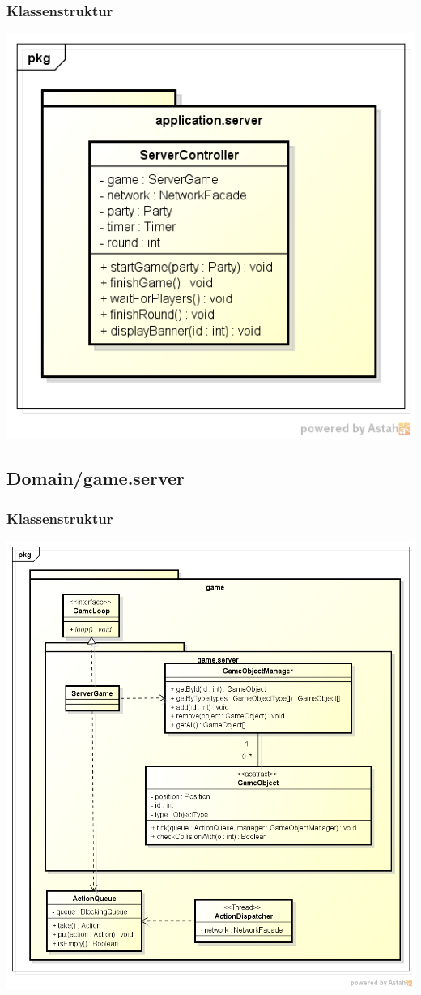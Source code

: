 \documentclass[11pt]{scrartcl}
\begin{document}
\subsubsection{Klassenstruktur}
\includegraphics[scale=0.75]{ClassDiagramApplicationServer}


\newpage

\subsection{Domain/game.server}

\subsubsection{Klassenstruktur}
\includegraphics[scale=0.5]{ClassDiagramGameServer}
\end{document}
